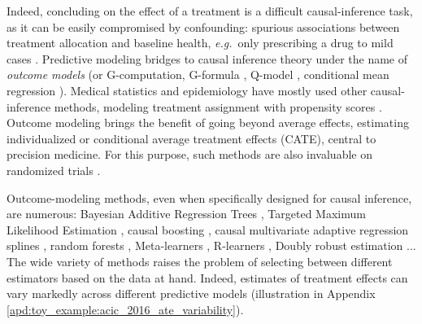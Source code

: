\documentclass[unnumsec,webpdf,contemporary,large]{oup-authoring-template}%
\theoremstyle{thmstyleone}%
\theoremstyle{thmstyletwo}%
\theoremstyle{thmstylethree}%
\newcommand{\eg}{\emph{e.g.}}
\begin{document}

Indeed, concluding on the effect of a treatment is a difficult
causal-inference task, as it can be easily compromised by confounding:
spurious associations between treatment
allocation and baseline health, \eg~only prescribing a drug to mild cases
\cite{hernan_causal_2020,vanderweele2019principles}.
Predictive modeling bridges to causal inference theory under the name of
\emph{outcome models} (or G-computation,
G-formula \cite{robins_role_1986}, Q-model
\cite{snowden_implementation_2011}, conditional mean regression
\cite{wendling_comparing_2018}).
Medical statistics and epidemiology have mostly used other
causal-inference methods, modeling treatment assignment
with propensity scores \cite{rosenbaum_central_1983,austin_moving_2015,casucci2018estimating,grose_use_2020}. Outcome modeling brings
the benefit of going
beyond average effects, estimating individualized or conditional average
treatment effects (CATE), central to precision medicine.
%
For this purpose, such methods are also invaluable on randomized trials
\cite{su2018random,lamont2018identification,hoogland2021tutorial}.


Outcome-modeling methods, even when specifically designed for causal
inference, are numerous: Bayesian Additive Regression Trees
\cite{hill_bayesian_2011}, Targeted Maximum Likelihood Estimation
\cite{laan_targeted_2011,schuler_targeted_2017}, causal boosting
\cite{powers_methods_2018}, causal multivariate adaptive regression
splines \cite{powers_methods_2018}, random forests
\cite{wager_estimation_2018, athey_generalized_2019},
Meta-learners \cite{kunzel_metalearners_2019}, R-learners
\cite{nie_quasioracle_2017}, Doubly robust estimation
\cite{chernozhukov_double_2018}...
The wide variety of methods raises the problem
of selecting between different estimators based on the data at hand. %
%
Indeed, estimates of treatment effects can vary markedly across different
predictive models \cite{fang2019applying,dorie_automated_2019} (illustration in
Appendix \ref{apd:toy_example:acic_2016_ate_variability}).
\end{document}

